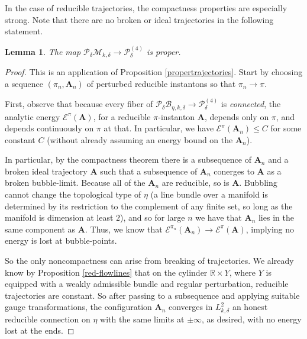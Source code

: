 \documentclass[10pt,a4paper]{amsart}
\newtheorem{lemma}[theorem]{Lemma}
\theoremstyle{definition}
\theoremstyle{remark}
\numberwithin{figure}{qchap}
\begin{document}
In the case of reducible trajectories, the compactness properties are especially strong. Note that there are no broken or ideal trajectories in the following statement.

\begin{lemma}\label{C-proper}The map $\mathcal P_\delta \mathcal M_{k,\delta} \to \mathcal P^{(4)}_{\delta}$ is proper.
\end{lemma}

\begin{proof}This is an application of Proposition \ref{propertrajectories}. Start by choosing a sequence $(\pi_n, \mathbf{A}_n)$ of perturbed reducible instantons so that $\pi_n \to \pi$.

First, observe that because every fiber of $\mathcal P_\delta \mathcal B_{\eta, k, \delta} \to \mathcal P^{(4)}_\delta$ is \emph{connected}, the analytic energy $\mathcal E^\pi(\mathbf{A})$, for a reducible $\pi$-instanton $\mathbf{A}$, depends only on $\pi$, and depends continuously on $\pi$ at that. In particular, we have $\mathcal E^{\pi}(\mathbf{A}_n) \leq C$ for some constant $C$ (without already assuming an energy bound on the $\mathbf{A}_n$).

In particular, by the compactness theorem there is a subsequence of $\mathbf{A}_n$ and a broken ideal trajectory $\mathbf{A}$ such that a subsequence of $\mathbf{A}_n$ conerges to $\mathbf{A}$ as a broken bubble-limit. Because all of the $\mathbf{A}_n$ are reducible, so is $\mathbf{A}$. Bubbling cannot change the topological type of $\eta$ (a line bundle over a manifold is determined by its restriction to the complement of any finite set, so long as the manifold is dimension at least $2$), and so for large $n$ we have that $\mathbf{A}_n$ lies in the same component as $\mathbf{A}$. Thus, we know that $\mathcal E^{\pi_n}(\mathbf{A}_n) \to \mathcal E^{\pi}(\mathbf{A})$, implying no energy is lost at bubble-points.

So the only noncompactness can arise from breaking of trajectories. We already know by Proposition \ref{red-flowlines} that on the cylinder $\mathbb R \times Y$, where $Y$ is equipped with a weakly admissible bundle and regular perturbation, reducible trajectories are constant. So after passing to a subsequence and applying suitable gauge transformations, the configuration $\mathbf{A}_n$ converges in $L^2_{k,\delta}$ an honest reducible connection on $\eta$ with the same limits at $\pm \infty$, as desired, with no energy lost at the ends.
\end{proof}
\end{document}
